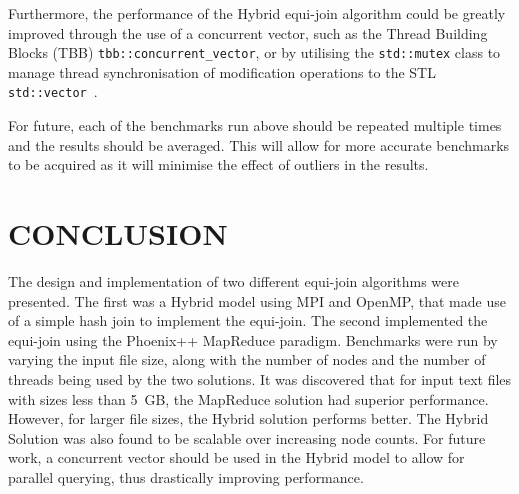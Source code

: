 \documentclass[12pt,twocolumn]{witseiepaper}
\begin{document}
Furthermore, the performance of the Hybrid equi-join algorithm could be greatly improved through the use of a concurrent vector, such as the Thread Building Blocks (TBB) \texttt{tbb::concurrent\_vector}, or by utilising the \texttt{std::mutex} class to manage thread synchronisation of modification operations to the STL \texttt{std::vector}~\cite{tbb,mutex}.

For future, each of the benchmarks run above should be repeated multiple times and the results should be averaged. This will allow for more accurate benchmarks to be acquired as it will minimise the effect of outliers in the results.

\section{CONCLUSION}
The design and implementation of two different equi-join algorithms were presented. The first was a Hybrid model using MPI and OpenMP, that made use of a simple hash join to implement the equi-join. The second implemented the equi-join using the Phoenix++ MapReduce paradigm. Benchmarks were run by varying the input file size, along with the number of nodes and the number of threads being used by the two solutions. It was discovered that for input text files with sizes less than 5~GB, the MapReduce solution had superior performance. However, for larger file sizes, the Hybrid solution performs better. The Hybrid Solution was also found to be scalable over increasing node counts. For future work, a concurrent vector should be used in the Hybrid model to allow for parallel querying, thus drastically improving performance.


{
	{\small

}
}
\end{document}
